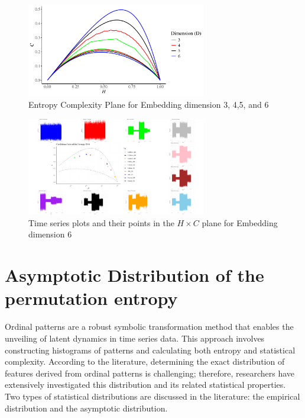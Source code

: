 
\begin{figure}[H]
	\centering
	\includegraphics[width=0.7\textwidth]{complexity plane}
	\caption{Entropy Complexity Plane for Embedding dimension 3, 4,5, and 6}
	\label{fig:complexity}
\end{figure}


\begin{figure}[H]
	\centering
	\includegraphics[width=0.7\textwidth]{combined plot}
	\caption{Time series plots and their points in the $H \times C$ plane for Embedding dimension 6}
	\label{fig:tentimeseries}
\end{figure}

\section{Asymptotic Distribution of the permutation entropy}\label{Sec:AsymptoticDistribution}
Ordinal patterns are a robust symbolic transformation method that enables the unveiling of latent dynamics in time series data. This approach involves constructing histograms of patterns and calculating both entropy and statistical complexity. According to the literature, determining the exact distribution of features derived from ordinal patterns is challenging; therefore, researchers have extensively investigated this distribution and its related statistical properties. Two types of statistical distributions are discussed in the literature: the empirical distribution and the asymptotic distribution.

